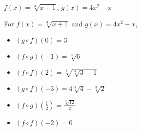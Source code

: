 {$f(x) = \sqrt[3]{x+1}$, $g(x) = 4x^2-x$}
{For  $f(x) = \sqrt[3]{x+1}$ and $g(x) = 4x^2-x$,
\begin{multicols}{2}

\begin{itemize}

\item  $(g\circ f)(0) = 3$

\item  $(f\circ g)(-1) = \sqrt[3]{6}$

\item  $(f \circ f)(2) = \sqrt[3]{\sqrt[3]{3}+1}$

\item  $(g\circ f)(-3) = 4\sqrt[3]{4}+\sqrt[3]{2}$

\item  $(f\circ g)\left(\frac{1}{2}\right) = \frac{\sqrt[3]{12}}{2}$

\item  $(f \circ f)(-2) = 0$

\end{itemize}

\end{multicols}}